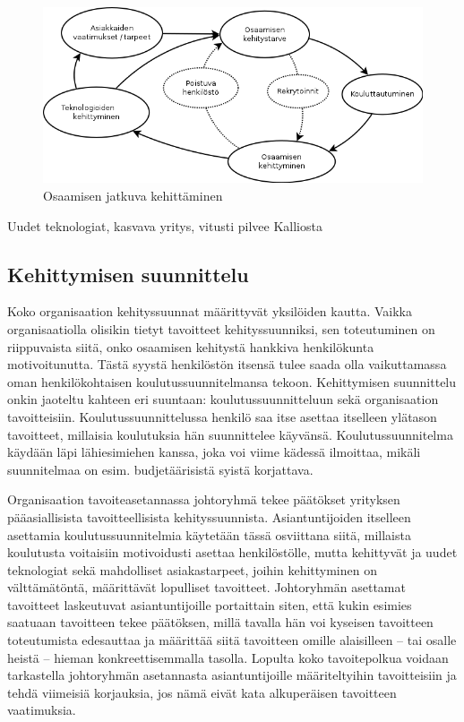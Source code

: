 \documentclass[a4paper,finnish,12pt]{article}
\begin{document}
\begin{figure}[ht]
\centering
\includegraphics[scale=0.5]{knowledge_circle.png}
\caption{Osaamisen jatkuva kehittäminen}
\label{fig:perusympyra}
\end{figure}

Uudet teknologiat, kasvava yritys, vitusti pilvee Kalliosta

\subsection{Kehittymisen suunnittelu}

Koko organisaation kehityssuunnat määrittyvät yksilöiden kautta. Vaikka organisaatiolla olisikin tietyt tavoitteet kehityssuunniksi, sen toteutuminen on riippuvaista siitä, onko osaamisen kehitystä hankkiva henkilökunta motivoitunutta. Tästä syystä henkilöstön itsensä tulee saada olla vaikuttamassa oman henkilökohtaisen koulutussuunnitelmansa tekoon. Kehittymisen suunnittelu onkin jaoteltu kahteen eri suuntaan: koulutussuunnitteluun sekä organisaation tavoitteisiin. Koulutussuunnittelussa henkilö saa itse asettaa itselleen ylätason tavoitteet, millaisia koulutuksia hän suunnittelee käyvänsä. Koulutussuunnitelma käydään läpi lähiesimiehen kanssa, joka voi viime kädessä ilmoittaa, mikäli suunnitelmaa on esim. budjetäärisistä syistä korjattava.

Organisaation tavoiteasetannassa johtoryhmä tekee päätökset yrityksen pääasiallisista tavoitteellisista kehityssuunnista. Asiantuntijoiden itselleen asettamia koulutussuunnitelmia käytetään tässä osviittana siitä, millaista koulutusta voitaisiin motivoidusti asettaa henkilöstölle, mutta kehittyvät ja uudet teknologiat sekä mahdolliset asiakastarpeet, joihin kehittyminen on välttämätöntä, määrittävät lopulliset tavoitteet. Johtoryhmän asettamat tavoitteet laskeutuvat asiantuntijoille portaittain siten, että kukin esimies saatuaan tavoitteen tekee päätöksen, millä tavalla hän voi kyseisen tavoitteen toteutumista edesauttaa ja määrittää siitä tavoitteen omille alaisilleen -- tai osalle heistä -- hieman konkreettisemmalla tasolla. Lopulta koko tavoitepolkua voidaan tarkastella johtoryhmän asetannasta asiantuntijoille määriteltyihin tavoitteisiin ja tehdä viimeisiä korjauksia, jos nämä eivät kata alkuperäisen tavoitteen vaatimuksia.
\end{document}
